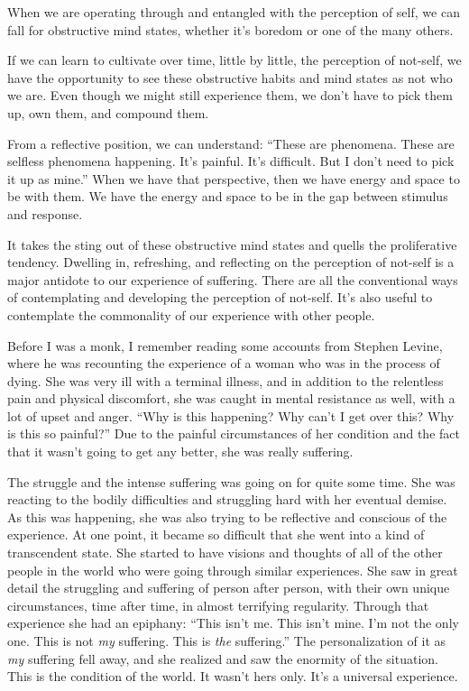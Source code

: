 When we are operating through and entangled with the perception of self, we can fall for obstructive mind states, whether it's boredom or one of the many others.

If we can learn to cultivate over time, little by little, the perception of not-self, we have the opportunity to see these obstructive habits and mind states as not who we are. Even though we might still experience them, we don't have to pick them up, own them, and compound them.

From a reflective position, we can understand: ``These are phenomena. These are selfless phenomena happening. It's painful. It's difficult. But I don't need to pick it up as mine.'' When we have that perspective, then we have energy and space to be with them. We have the energy and space to be in the gap between stimulus and response.

It takes the sting out of these obstructive mind states and quells the proliferative tendency. Dwelling in, refreshing, and reflecting on the perception of not-self
is a major antidote to our experience of suffering. There are all the conventional ways of contemplating and developing the perception of not-self. It's also useful to contemplate the commonality of our experience with other people.

Before I was a monk, I remember reading some accounts from Stephen Levine, where he was recounting the experience of a woman who was in the process of dying. She was very ill with a terminal illness, and in addition to the relentless pain and physical discomfort, she was caught in mental resistance as well, with a lot of upset and anger. ``Why is this happening? Why can't I get over this? Why is this so painful?'' Due to the painful circumstances of her condition and the fact that it wasn't going to get any better, she was really suffering.

The struggle and the intense suffering was going on for quite some time. She was reacting to the bodily difficulties and struggling hard with her eventual demise. As this was happening, she was also trying to be reflective and conscious of the experience. At one point, it became so difficult that she went into a kind of transcendent state. She started to have visions and thoughts of all of the other people in the world who were going through similar experiences. She saw in great detail the struggling and suffering of person after person, with their own unique circumstances, time after time, in almost terrifying regularity. Through that experience she had an epiphany: ``This isn't me. This isn't mine. I'm not the only one. This is not \emph{my} suffering. This is \emph{the} suffering.'' The personalization of it as \emph{my} suffering fell away, and she realized and saw the enormity of the situation. This is the condition of the world. It wasn't hers only. It's a universal experience.

